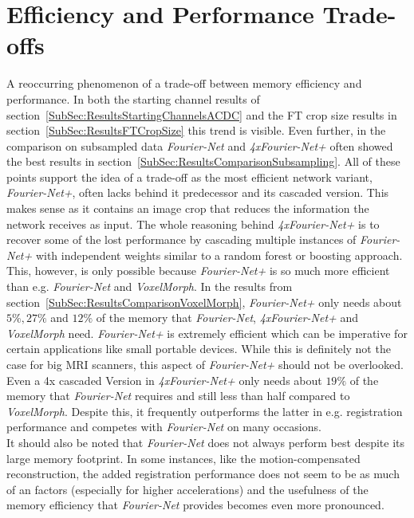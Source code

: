 \section{Efficiency and Performance Trade-offs} \label{Sec:EfficiencyPerformanceTrade-offs}
A reoccurring phenomenon of a trade-off between memory efficiency and performance. In both the starting channel results of section~\ref{SubSec:ResultsStartingChannelsACDC} and the FT crop size results in section~\ref{SubSec:ResultsFTCropSize} this trend is visible. Even further, in the comparison on subsampled data \emph{Fourier-Net} and \emph{4xFourier-Net+} often showed the best results in section~\ref{SubSec:ResultsComparisonSubsampling}. All of these points support the idea of a trade-off as the most efficient network variant, \emph{Fourier-Net+}, often lacks behind it predecessor and its cascaded version. This makes sense as it contains an image crop that reduces the information the network receives as input. The whole reasoning behind \emph{4xFourier-Net+} is to recover some of the lost performance by cascading multiple instances of \emph{Fourier-Net+} with independent weights similar to a random forest or boosting approach.\\
This, however, is only possible because \emph{Fourier-Net+} is so much more efficient than e.g. \emph{Fourier-Net} and \emph{VoxelMorph}. In the results from section~\ref{SubSec:ResultsComparisonVoxelMorph}, \emph{Fourier-Net+} only needs about $5 \%, 27 \%$ and $12 \%$ of the memory that \emph{Fourier-Net}, \emph{4xFourier-Net+} and \emph{VoxelMorph} need. \emph{Fourier-Net+} is extremely efficient which can be imperative for certain applications like small portable devices. While this is definitely not the case for big MRI scanners, this aspect of \emph{Fourier-Net+} should not be overlooked. Even a 4x cascaded Version in \emph{4xFourier-Net+} only needs about $19 \%$ of the memory that \emph{Fourier-Net} requires and still less than half compared to \emph{VoxelMorph}. Despite this, it frequently outperforms the latter in e.g. registration performance and competes with \emph{Fourier-Net} on many occasions.\\
It should also be noted that \emph{Fourier-Net} does not always perform best despite its large memory footprint. In some instances, like the motion-compensated reconstruction, the added registration performance does not seem to be as much of an factors (especially for higher accelerations) and the usefulness of the memory efficiency that \emph{Fourier-Net} provides becomes even more pronounced.

